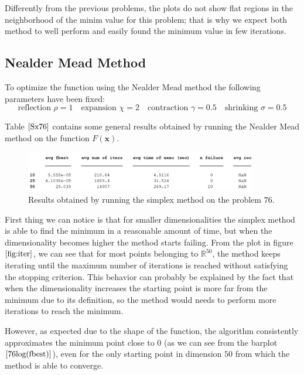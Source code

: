 Differently from the previous problems, the plots do not show flat regions in the neighborhood of the minim value for this problem; that is why we expect both method to well perform and easily found the minimum value in few iterations.  

\medskip
\subsection*{Nealder Mead Method}
To optimize the function using the Nealder Mead method the following parameters have been fixed:
\begin{equation*}
    \text{reflection } \rho = 1 \quad
    \text{expansion } \chi = 2 \quad
    \text{contraction } \gamma = 0.5 \quad
    \text{shrinking } \sigma = 0.5
\end{equation*}

Table $\eqref{Sx76}$ contains some general results obtained by running the Nealder Mead method on the function $F(\mathbf{x})$.

\begin{figure}[htbp]
    \centering
    \includegraphics[width = 0.9\textwidth]{img/pb76_table_SX.png}
    \caption{Results obtained by running the simplex method on the problem $76$.}
    \label{Sx76}
\end{figure}

First thing we can notice is that for smaller dimensionalities the simplex method is able to find the minimum in a reasonable amount of time, but when the dimensionality becomes higher the method starts failing.
From the plot in figure $\eqref{fig:iter}$, we can see that for most points belonging to $\mathbb{R}^{50}$, the method keeps iterating until the maximum number of iterations is reached without satisfying the stopping criterion.
This behavior can probably be explained by the fact that when the dimensionality increases the starting point is more far from the minimum due to its definition, so the method would needs to perform more iterations to reach the minimum.

However, as expected due to the shape of the function, the algorithm consistently approximates the minimum point close to $0$ (as we can see from the barplot $\eqref{76log(fbest)}$), even for the only starting point in dimension $50$ from which the method is able to converge.

